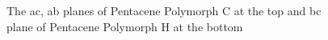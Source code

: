  	
 	\begin{figure}[H]
 		\begin{center}
 		\end{center}
 		\caption{The ac, ab planes of Pentacene Polymorph C at the top and bc plane of Pentacene Polymorph H at the bottom}  \label{fig-Pentasol}
 	\end{figure}
 	
